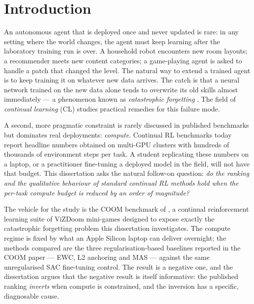 \chapter{Introduction}
\label{ch:intro}

An autonomous agent that is deployed once and never updated is rare:
in any setting where the world changes, the agent must keep learning
after the laboratory training run is over. A household robot
encounters new room layouts; a recommender meets new content
categories; a game-playing agent is asked to handle a patch that
changed the level. The natural way to extend a trained agent is to
keep training it on whatever new data arrives. The catch is that a
neural network trained on the new data alone tends to overwrite its
old skills almost immediately --- a phenomenon known as
\emph{catastrophic forgetting} \citep{french1999catastrophic,
kirkpatrick2017ewc}. The field of \emph{continual learning} (CL)
studies practical remedies for this failure mode.

A second, more pragmatic constraint is rarely discussed in published
benchmarks but dominates real deployments: \emph{compute}. Continual
RL benchmarks today report headline numbers obtained on multi-GPU
clusters with hundreds of thousands of environment steps per task. A
student replicating these numbers on a laptop, or a practitioner
fine-tuning a deployed model in the field, will not have that budget.
This dissertation asks the natural follow-on question: \emph{do the
ranking and the qualitative behaviour of standard continual RL methods
hold when the per-task compute budget is reduced by an order of
magnitude?}

The vehicle for the study is the COOM benchmark of
\citet{tomilin2024coom}, a continual reinforcement learning suite of
ViZDoom \citep{kempka2016vizdoom} mini-games designed to expose
exactly the catastrophic forgetting problem this dissertation
investigates. The compute regime is fixed by what an Apple Silicon
laptop can deliver overnight; the methods compared are the three
regularisation-based baselines reported in the COOM paper --- EWC, L2
anchoring and MAS --- against the same unregularised SAC fine-tuning
control. The result is a negative one, and the dissertation argues
that the negative result is itself informative: the published ranking
\emph{inverts} when compute is constrained, and the inversion has a
specific, diagnosable cause.

